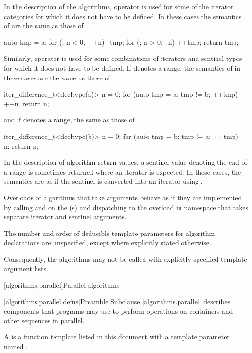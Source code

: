 \pnum
In the description of the algorithms, operator \tcode{+}
is used for some of the iterator categories
for which it does not have to be defined.
In these cases the semantics of  are the same as those of
\begin{codeblock}
auto tmp = a;
for (; n < 0; ++n) --tmp;
for (; n > 0; --n) ++tmp;
return tmp;
\end{codeblock}
Similarly, operator \tcode{-} is used
for some combinations of iterators and sentinel types
for which it does not have to be defined.
If  denotes a range,
the semantics of  in these cases are the same as those of
\begin{codeblock}
iter_difference_t<decltype(a)> n = 0;
for (auto tmp = a; tmp != b; ++tmp) ++n;
return n;
\end{codeblock}
and if  denotes a range, the same as those of
\begin{codeblock}
iter_difference_t<decltype(b)> n = 0;
for (auto tmp = b; tmp != a; ++tmp) --n;
return n;
\end{codeblock}

\pnum
In the description of algorithm return values,
a sentinel value  denoting the end of a range 
is sometimes returned where an iterator is expected.
In these cases,
the semantics are as if the sentinel is converted into an iterator using
.

\pnum
Overloads of algorithms that take  arguments
behave as if they are implemented by calling  and
 on the (s) and
dispatching to the overload in namespace 
that takes separate iterator and sentinel arguments.

\pnum
The number and order of deducible template parameters for algorithm declarations
are unspecified, except where explicitly stated otherwise.
\begin{note}
Consequently, the algorithms may not
be called with explicitly-specified template argument lists.
\end{note}

[algorithms.parallel]{Parallel algorithms}

[algorithms.parallel.defns]{Preamble}
\pnum
Subclause \ref{algorithms.parallel} describes components that \Cpp{} programs may use
to perform operations on containers and other sequences in parallel.

\pnum
A  is a function template listed in this document
with a template parameter named .


